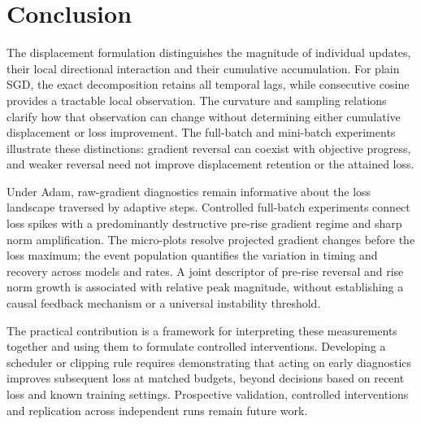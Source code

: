 \section{Conclusion}
\label{sec:conclusion}

The displacement formulation distinguishes the magnitude of individual updates,
their local directional interaction and their cumulative accumulation. For
plain SGD, the exact decomposition retains all temporal lags, while consecutive
cosine provides a tractable local observation. The curvature and sampling
relations clarify how that observation can change without determining either
cumulative displacement or loss improvement. The full-batch and mini-batch
experiments illustrate these distinctions: gradient reversal can coexist with
objective progress, and weaker reversal need not improve displacement retention
or the attained loss.

Under Adam, raw-gradient diagnostics remain informative about the loss
landscape traversed by adaptive steps. Controlled full-batch experiments
connect loss spikes with a predominantly destructive pre-rise gradient
regime and sharp norm amplification. The micro-plots resolve projected
gradient changes before the loss maximum; the event population quantifies
the variation in timing and recovery across models and rates. A joint
descriptor of pre-rise reversal and rise norm growth is associated with
relative peak magnitude, without establishing a causal feedback mechanism
or a universal instability threshold.

The practical contribution is a framework for interpreting these measurements
together and using them to formulate controlled interventions. Developing a
scheduler or clipping rule requires demonstrating that acting on early
diagnostics improves subsequent loss at matched budgets, beyond decisions
based on recent loss and known training settings. Prospective validation,
controlled interventions and replication across independent runs remain
future work.
